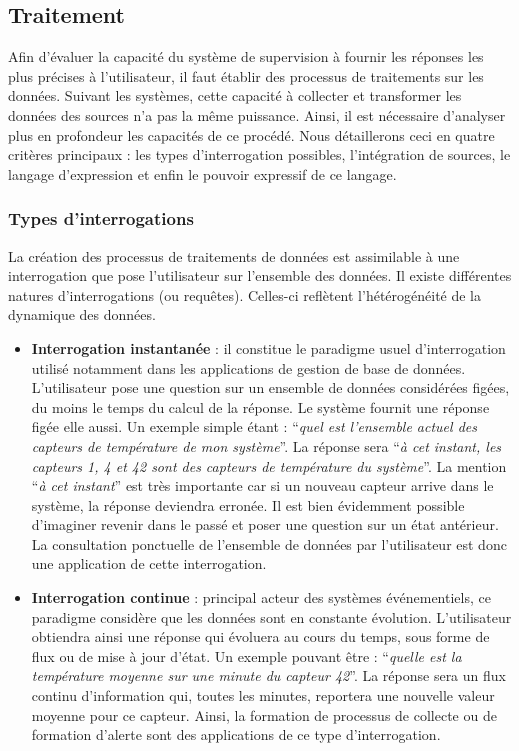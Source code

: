 \subsection{Traitement}\label{sec:rw:supervision:criteres:traitement}
Afin d'évaluer la capacité du système de supervision à fournir les réponses les plus précises à l'utilisateur, il faut établir des processus de traitements sur les données. Suivant les systèmes, cette capacité à collecter et transformer les données des sources n'a pas la même puissance. Ainsi, il est nécessaire d'analyser plus en profondeur les capacités de ce procédé. Nous détaillerons ceci en quatre critères principaux : les types d'interrogation possibles, l'intégration de sources, le langage d'expression et enfin le pouvoir expressif de ce langage.

\subsubsection{Types d'interrogations}
La création des processus de traitements de données est assimilable à une interrogation que pose l'utilisateur sur l'ensemble des données. Il existe différentes natures d'interrogations (ou requêtes). Celles-ci reflètent l'hétérogénéité de la dynamique des données.
\begin{itemize}
    \item \textbf{Interrogation instantanée} : il constitue le paradigme usuel d'interrogation utilisé notamment dans les applications de gestion de base de données. L'utilisateur pose une question sur un ensemble de données considérées figées, du moins le temps du calcul de la réponse. Le système fournit une réponse figée elle aussi. Un exemple simple étant : \enquote{\it quel est l'ensemble actuel des capteurs de température de mon système}. La réponse sera \enquote{\it à cet instant, les capteurs 1, 4 et 42 sont des capteurs de température du système}. La mention \enquote{\it à cet instant} est très importante car si un nouveau capteur arrive dans le système, la réponse deviendra erronée. Il est bien évidemment possible d'imaginer revenir dans le passé et poser une question sur un état antérieur. La consultation ponctuelle de l'ensemble de données par l'utilisateur est donc une application de cette interrogation.
    \item \textbf{Interrogation continue} : principal acteur des systèmes événementiels, ce paradigme considère que les données sont en constante évolution. L'utilisateur obtiendra ainsi une réponse qui évoluera au cours du temps, sous forme de flux ou de mise à jour d'état. Un exemple pouvant être : \enquote{\it quelle est la température moyenne sur une minute du capteur 42}. La réponse sera un flux continu d'information qui, toutes les minutes, reportera une nouvelle valeur moyenne pour ce capteur. Ainsi, la formation de processus de collecte ou de formation d'alerte sont des applications de ce type d'interrogation.
\end{itemize}
